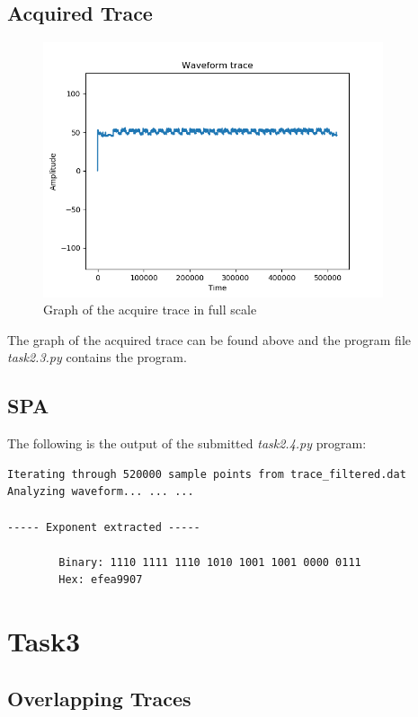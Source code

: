 \documentclass[1p,16pt]{elsarticle}
\begin{document}
\subsection{Acquired Trace}%
\label{sub:acquired_trace}

\begin{figure}[H]
	\centering
    \centerline{\includegraphics[width=10cm]{trace_plot}}
    \caption{Graph of the acquire trace in full scale}\label{fig:acquired_trace}
\end{figure}

The graph of the acquired trace can be found above and
the program file \textit{task2.3.py} contains the program.

\subsection{SPA}%
\label{sub:spa}

The following is the output of the submitted \textit{task2.4.py} program:
\begin{verbatim}
Iterating through 520000 sample points from trace_filtered.dat
Analyzing waveform... ... ...

----- Exponent extracted -----

        Binary: 1110 1111 1110 1010 1001 1001 0000 0111
		Hex: efea9907
\end{verbatim}

\section{Task3}

\subsection{Overlapping Traces}%
\label{sub:overlapping_traces}
\end{document}
